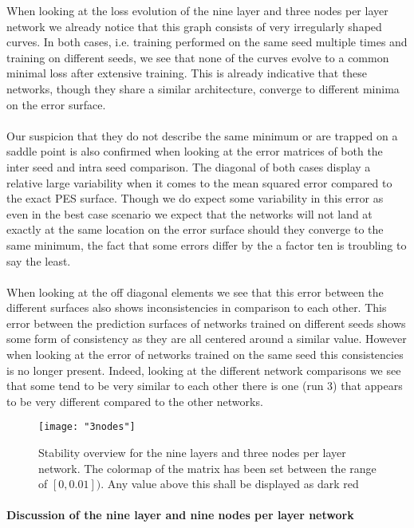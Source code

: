 \documentclass[12pt]{article}
\begin{document}
When looking at the loss evolution of the nine layer and three nodes per layer network we already notice that this graph consists of very irregularly shaped curves. In both cases, i.e. training performed on the same seed multiple times and training on different seeds, we see that none of the curves evolve to a common minimal loss after extensive training. This is already indicative that these networks, though they share a similar architecture, converge to different minima on the error surface.
\\
\\
Our suspicion that they do not describe the same minimum or are trapped on a saddle point is also confirmed when looking at the error matrices of both the inter seed and intra seed comparison. The diagonal of both cases display a relative large variability when it comes to the mean squared error compared to the exact PES surface. Though we do expect some variability in this error as even in the best case scenario we expect that the networks will not land at exactly at the same location on the error surface should they converge to the same minimum, the fact that some errors differ by the a factor ten is troubling to say the least.
\\
\\
When looking at the off diagonal elements we see that this error between the different surfaces also shows inconsistencies in comparison to each other. This error between the prediction surfaces of networks trained on different seeds shows some form of consistency as they are all centered around a similar value. However when looking at the error of networks trained on the same seed this consistencies is no longer present. Indeed, looking at the different network comparisons we see that some tend to be very similar to each other there is one (run 3) that appears to be very different compared to the other networks.

\begin{figure}[H]
	\centering
	\texttt{[image: "3nodes"]}
	\caption{Stability overview for the nine layers and three nodes per layer network. The colormap of the matrix has been set between the range of $\left[0,0.01\right])$. Any value above this shall be displayed as dark red}
\end{figure}

\paragraph{Discussion of the nine layer and nine nodes per layer network}
\end{document}

